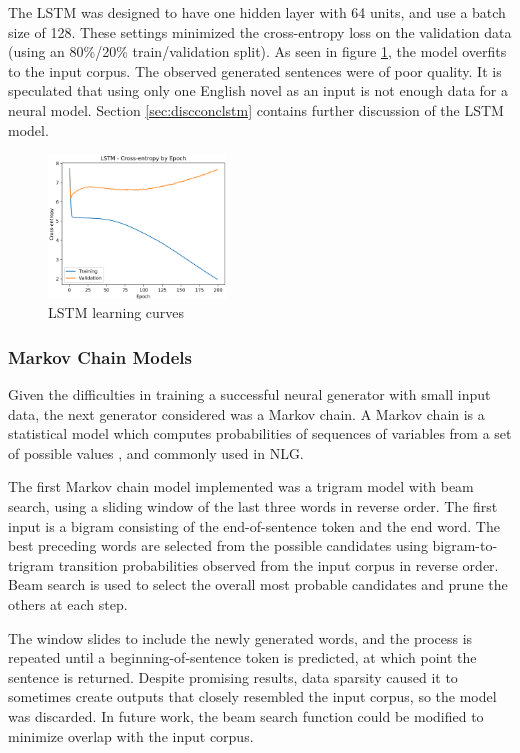 \documentclass[11pt,a4paper]{article}
\begin{document}
The LSTM was designed to have one hidden layer with 64 units, and use a batch size of 128. These settings minimized the cross-entropy loss on the validation data (using an 80\%/20\% train/validation split). As seen in figure \ref{fig:LearningCurves}, the model overfits to the input corpus. The observed generated sentences were of poor quality. It is speculated that using only one English novel as an input is not enough data for a neural model. Section \ref{sec:discconclstm} contains further discussion of the LSTM model.

\begin{figure}[h]
    \centering
    \includegraphics[width=0.42\textwidth]{LSTM_Loss.png}
    \caption{LSTM learning curves}
    \label{fig:LearningCurves}
\end{figure}

\subsubsection{Markov Chain Models}
\label{sec:markov}

Given the difficulties in training a successful neural generator with small input data, the next generator considered was a Markov chain. A Markov chain is a statistical model which computes probabilities of sequences of variables from a set of possible values \cite[Chapter~8]{jurafskymarkov}, and commonly used in NLG.

The first Markov chain model implemented was a trigram model with beam search, using a sliding window of the last three words in reverse order. The first input is a bigram consisting of the end-of-sentence token and the end word. The best preceding words are selected from the possible candidates using bigram-to-trigram transition probabilities observed from the input corpus in reverse order. Beam search is used to select the overall most probable candidates and prune the others at each step.

The window slides to include the newly generated words, and the process is repeated until a beginning-of-sentence token is predicted, at which point the sentence is returned. Despite promising results, data sparsity caused it to sometimes create outputs that closely resembled the input corpus, so the model was discarded. In future work, the beam search function could be modified to minimize overlap with the input corpus.
\end{document}
